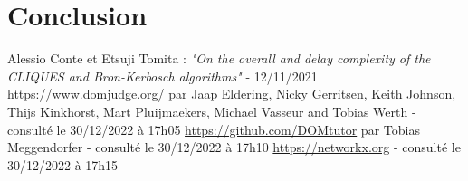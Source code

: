 \documentclass[a4paper, 12pt]{article}
\begin{document}
\section{Conclusion}


\newpage
\begin{thebibliography}{unsrt}
 Alessio Conte et Etsuji Tomita :  \textit{"On the overall and delay complexity of the CLIQUES and Bron-Kerbosch algorithms"} -  12/11/2021
 \url{https://www.domjudge.org/} par Jaap Eldering, Nicky Gerritsen, Keith Johnson, Thijs Kinkhorst, Mart Pluijmaekers, Michael Vasseur and Tobias Werth - consulté le 30/12/2022 à 17h05
 \url{https://github.com/DOMtutor} par Tobias Meggendorfer - consulté le 30/12/2022 à 17h10
 \url{https://networkx.org} - consulté le 30/12/2022 à 17h15
\end{thebibliography}
\end{document}
